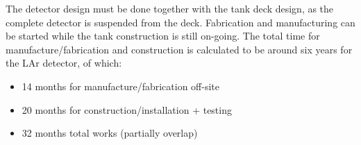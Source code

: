 The detector design must be done together with the tank deck design,
as the complete detector is suspended from the deck.  Fabrication and
manufacturing can be started while the tank construction is still
on-going.  The total time for manufacture/fabrication and construction
is calculated to be around six years for the LAr detector, of which:
\begin{itemize}
\item{14 months		for manufacture/fabrication off-site}
\item{20 months		for construction/installation + testing}
\item{32 months		total works (partially overlap)}
\end{itemize}
